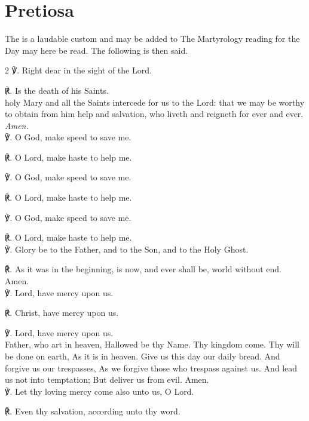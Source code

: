\section{Pretiosa}
\fancyhead[RE,LO]{}
\begin{secrubric}
    The  is a laudable custom and may be added to  The Martyrology reading for the Day may here be read. The following is then said.
\end{secrubric}
\begin{multicols}{2}
℣. Right dear in the sight of the Lord.

℟. Is the death of his Saints.\\

 holy Mary and all the Saints intercede for us to the Lord: that we may be worthy to obtain from him help and salvation, who liveth and reigneth for ever and ever. \textit{Amen.}\\

℣. O God, {} make speed to save me.

℟. O Lord, make haste to help me.

℣. O God, {} make speed to save me.

℟. O Lord, make haste to help me.

℣. O God, {} make speed to save me.

℟. O Lord, make haste to help me.\\

℣. Glory be to the Father, and to the Son, and to the Holy Ghost.

℟. As it was in the beginning, is now, and ever shall be, world without end. Amen.\\

℣. Lord, have mercy upon us.

℟. Christ, have mercy upon us.

℣. Lord, have mercy upon us.\\

 Father, who art in heaven, Hallowed be thy Name. Thy kingdom come. Thy will be done on earth, As it is in heaven. Give us this day our daily bread. And forgive us our trespasses, As we forgive those who trespass against us. And lead us not into temptation; But deliver us from evil. Amen.\\

℣. Let thy loving mercy come also unto us, O Lord.

℟. Even thy salvation, according unto thy word.


\end{multicols}
